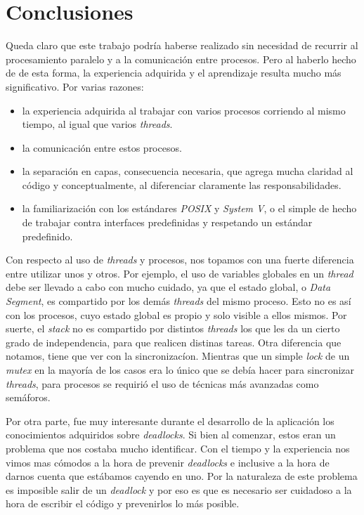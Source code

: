 \documentclass[a4paper,10pt]{article}
\begin{document}
\newpage
\section{Conclusiones}

Queda claro que este trabajo podría haberse realizado sin necesidad de recurrir al procesamiento paralelo y a la comunicación entre procesos. Pero al haberlo 
hecho de de esta forma, la experiencia adquirida y el aprendizaje resulta mucho más significativo. Por varias razones:

\begin{itemize}
\item la experiencia adquirida al trabajar con varios procesos corriendo al mismo tiempo, al igual que varios \textit{threads}.
\item la comunicación entre estos procesos.
\item la separación en capas, consecuencia necesaria, que agrega mucha claridad al código y conceptualmente, al diferenciar claramente las responsabilidades.
\item la familiarización con los estándares \textit{POSIX} y \textit{System V}, o el simple de hecho de trabajar contra interfaces predefinidas y respetando
      un estándar predefinido.
\end{itemize}

Con respecto al uso de \textit{threads}  y procesos, nos topamos con una fuerte diferencia entre utilizar unos y otros. Por ejemplo, el uso de variables globales 
en un \textit{thread} debe ser llevado a cabo con mucho cuidado, ya que el estado global, o \textit{Data Segment}, es compartido por los demás \textit{threads} 
del mismo proceso. Esto no es así con los procesos, cuyo estado global es propio y solo visible a ellos mismos. Por suerte, el \textit{stack} no es compartido 
por distintos \textit{threads} los que les da un cierto grado de independencia, para que realicen distinas tareas. Otra diferencia que notamos, tiene que ver 
con la sincronizacíon. Mientras que un simple \textit{lock} de un \textit{mutex} en la mayoría de los casos era lo único que se debía hacer para sincronizar 
\textit{threads}, para procesos se requirió el uso de técnicas más avanzadas como semáforos.

Por otra parte, fue muy interesante durante el desarrollo de la aplicación los conocimientos adquiridos sobre \textit{deadlocks}.
Si bien al comenzar, estos eran un problema que nos costaba mucho identificar. Con el tiempo y la experiencia nos vimos mas cómodos
a la hora de prevenir \textit{deadlocks} e inclusive a la hora de darnos cuenta que estábamos cayendo en uno. Por la naturaleza de este
problema es imposible salir de un \textit{deadlock} y por eso es que es necesario ser cuidadoso a la hora de escribir el
código y prevenirlos lo más posible.
\end{document}
